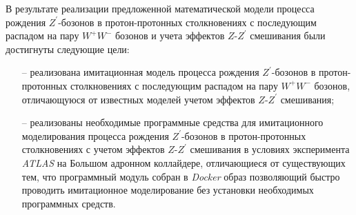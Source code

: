 
В результате реализации предложенной математической модели процесса рождения ${Z}^{\prime}$-бозонов в протон-протонных столкновениях с последующим распадом на пару ${W}^{+}{W}^{-}$ бозонов и учета эффектов $Z$-${Z}^{\prime}$ смешивания были достигнуты следующие цели: 
\begin{enumerate}
	\item[--] реализована имитационная модель процесса рождения ${Z}^{\prime}$-бозонов в протон-протонных столкновениях с последующим распадом на пару ${W}^{+}{W}^{-}$ бозонов, отличающуюся от известных моделей учетом эффектов $Z$-${Z}^{\prime}$ смешивания;
	\item[--] реализованы необходимые программные средства для имитационного моделирования процесса
	рождения ${Z}^{\prime}$-бозонов в протон-протонных столкновениях с учетом эффектов $Z$-${Z}^{\prime}$ смешивания в условиях эксперимента \textit{ATLAS} на Большом адронном коллайдере, отличающиеся от существующих тем, что программный модуль собран в \textit{Docker} образ позволяющий быстро проводить имитационное моделирование без установки необходимых программных средств.
\end{enumerate}
